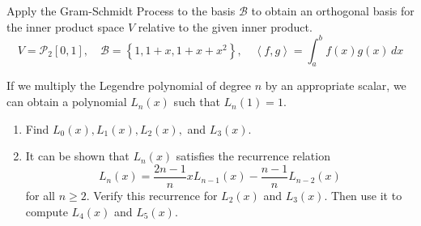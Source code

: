 \documentclass[11pt,letterpaper,boxed]{hmcpset}
\newcommand{\crb}[1]{\left\{ #1 \right\}}
\newcommand{\lra}[1]{\left\langle #1 \right\rangle}
\begin{document}
\begin{solution}
\vfill
\end{solution}
\newpage

\begin{problem}[Poole 7.1 \#40]
Apply the Gram-Schmidt Process to the basis $\mathcal{B}$ to obtain an orthogonal basis for the inner product space $V$ relative to the given inner product.
\[
	V = \mathcal{P}_2[0,1], \quad \mathcal{B} = \crb{1,1+x,1+x+x^2}, \quad \lra{f,g} = \int_a^b f(x)g(x)\,dx
\]
\end{problem}

\begin{solution}
\vfill
\end{solution}
\newpage

\begin{problem}[Poole 7.1 \#42]
If we multiply the Legendre polynomial of degree $n$ by an appropriate scalar, we can obtain a polynomial $L_n(x)$ such that $L_n(1)=1$.
\begin{enumerate}
\item Find $L_0(x),L_1(x), L_2(x),$ and $L_3(x)$.
\item It can be shown that $L_n(x)$ satisfies the recurrence relation
\[
	L_n(x) = \frac{2n-1}{n}xL_{n-1}(x)-\frac{n-1}{n}L_{n-2}(x)
\]
for all $n\geq2$. Verify this recurrence for $L_2(x)$ and $L_3(x)$. Then use it to compute $L_4(x)$ and $L_5(x)$.
\end{enumerate}
\end{problem}

\begin{solution}
\vfill
\end{solution}
\end{document}
